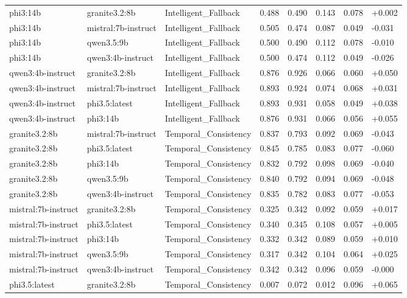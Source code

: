 \begin{table}
\begin{tabular}{llllllll}
phi3:14b & granite3.2:8b & Intelligent_Fallback & 0.488 & 0.490 & 0.143 & 0.078 & +0.002 \\
phi3:14b & mistral:7b-instruct & Intelligent_Fallback & 0.505 & 0.474 & 0.087 & 0.049 & -0.031 \\
phi3:14b & qwen3.5:9b & Intelligent_Fallback & 0.500 & 0.490 & 0.112 & 0.078 & -0.010 \\
phi3:14b & qwen3:4b-instruct & Intelligent_Fallback & 0.500 & 0.474 & 0.112 & 0.049 & -0.026 \\
qwen3:4b-instruct & granite3.2:8b & Intelligent_Fallback & 0.876 & 0.926 & 0.066 & 0.060 & +0.050 \\
qwen3:4b-instruct & mistral:7b-instruct & Intelligent_Fallback & 0.893 & 0.924 & 0.074 & 0.068 & +0.031 \\
qwen3:4b-instruct & phi3.5:latest & Intelligent_Fallback & 0.893 & 0.931 & 0.058 & 0.049 & +0.038 \\
qwen3:4b-instruct & phi3:14b & Intelligent_Fallback & 0.876 & 0.931 & 0.066 & 0.056 & +0.055 \\
granite3.2:8b & mistral:7b-instruct & Temporal_Consistency & 0.837 & 0.793 & 0.092 & 0.069 & -0.043 \\
granite3.2:8b & phi3.5:latest & Temporal_Consistency & 0.845 & 0.785 & 0.083 & 0.077 & -0.060 \\
granite3.2:8b & phi3:14b & Temporal_Consistency & 0.832 & 0.792 & 0.098 & 0.069 & -0.040 \\
granite3.2:8b & qwen3.5:9b & Temporal_Consistency & 0.840 & 0.792 & 0.094 & 0.069 & -0.048 \\
granite3.2:8b & qwen3:4b-instruct & Temporal_Consistency & 0.835 & 0.782 & 0.083 & 0.077 & -0.053 \\
mistral:7b-instruct & granite3.2:8b & Temporal_Consistency & 0.325 & 0.342 & 0.092 & 0.059 & +0.017 \\
mistral:7b-instruct & phi3.5:latest & Temporal_Consistency & 0.340 & 0.345 & 0.108 & 0.057 & +0.005 \\
mistral:7b-instruct & phi3:14b & Temporal_Consistency & 0.332 & 0.342 & 0.089 & 0.059 & +0.010 \\
mistral:7b-instruct & qwen3.5:9b & Temporal_Consistency & 0.317 & 0.342 & 0.104 & 0.064 & +0.025 \\
mistral:7b-instruct & qwen3:4b-instruct & Temporal_Consistency & 0.342 & 0.342 & 0.096 & 0.059 & -0.000 \\
phi3.5:latest & granite3.2:8b & Temporal_Consistency & 0.007 & 0.072 & 0.012 & 0.096 & +0.065 \\

\end{tabular}
\end{table}
